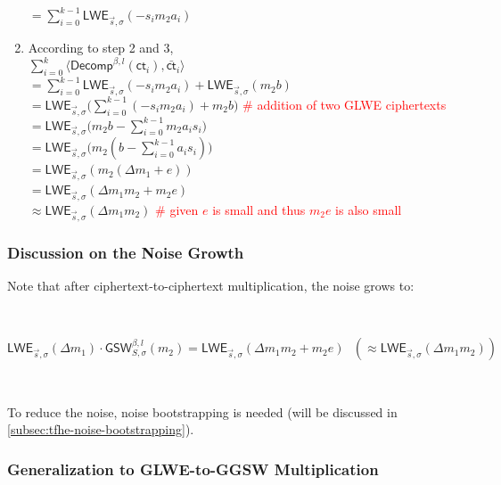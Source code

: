 \begin{myproof}
\begin{enumerate}
$= \sum\limits_{i=0}^{k-1}\textsf{LWE}_{\vec{s}, \sigma}(-s_im_2a_i)$
\item According to step 2 and 3, \\
$\sum\limits_{i=0}^{k}\langle \textsf{Decomp}^{\beta, l}(\textsf{ct}_i), \bar{\textsf{ct}}_i \rangle$ \\
$= \sum\limits_{i=0}^{k-1}\textsf{LWE}_{\vec{s}, \sigma}(-s_im_2a_i) + \textsf{LWE}_{\vec{s}, \sigma} (m_{2}b)$ \\ 
$= \textsf{LWE}_{\vec{s}, \sigma}\Big(\sum\limits_{i=0}^{k-1}(-s_im_2a_i) + m_{2}b\Big)$ \textcolor{red}{\# addition of two GLWE ciphertexts} \\ 
$= \textsf{LWE}_{\vec{s}, \sigma}\Big(m_2b - \sum\limits_{i=0}^{k-1}m_2a_is_i\Big)$  \\ 
$= \textsf{LWE}_{\vec{s}, \sigma}\Big(m_2(b - \sum\limits_{i=0}^{k-1}a_is_i)\Big)$\\
$= \textsf{LWE}_{\vec{s}, \sigma}(m_2(\Delta m_1 + e))$ \\
$= \textsf{LWE}_{\vec{s}, \sigma}(\Delta m_1m_2 + m_2e)$ \\
$\approx \textsf{LWE}_{\vec{s}, \sigma}(\Delta m_1m_2)$ \textcolor{red}{\# given $e$ is small and thus $m_2e$ is also small}
\end{enumerate}

\end{myproof}

\subsubsection{Discussion on the Noise Growth}

Note that after ciphertext-to-ciphertext multiplication, the noise grows to: 

$ $

$\textsf{LWE}_{\vec{s}, \sigma}(\Delta m_1) \cdot \textsf{GSW}_{S, \sigma}^{\beta, l}(m_2) = \textsf{LWE}_{\vec{s}, \sigma}(\Delta m_1m_2 + m_2e) \text{ } (\approx \textsf{LWE}_{\vec{s}, \sigma}(\Delta m_1m_2))$

$ $

\noindent 
To reduce the noise, noise bootstrapping is needed (will be discussed in \autoref{subsec:tfhe-noise-bootstrapping}).

\subsubsection{Generalization to GLWE-to-GGSW Multiplication}
\label{subsubsec:tfhe-glwe-to-ggsw-multiplication}

